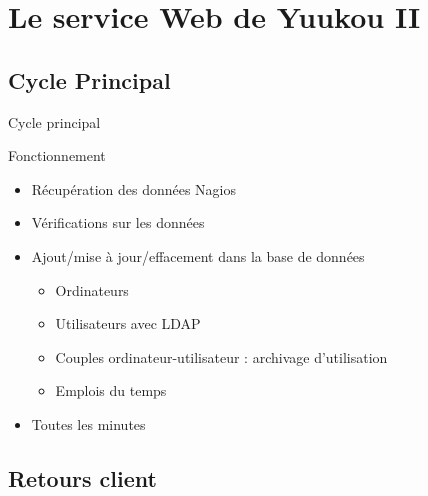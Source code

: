 \section{Le service Web de Yuukou II}

\subsection{Cycle Principal}

\begin{frame}{Cycle principal}
	\begin{block}{Fonctionnement}
		\begin{itemize}
			\item R\'ecup\'eration des donn\'ees Nagios
			\item V\'erifications sur les donn\'ees
			\item Ajout/mise \`a jour/effacement dans la base de donn\'ees
			\begin{itemize}
				\item Ordinateurs
				\item Utilisateurs avec LDAP
				\item Couples ordinateur-utilisateur : archivage d'utilisation
				\item Emplois du temps
			
			\end{itemize}
			
			\item Toutes les minutes

		\end{itemize}

	\end{block}

\end{frame}


\subsection{Retours client}

